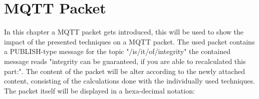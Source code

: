 \section{MQTT Packet}

In this chapter a MQTT packet gets introduced, this will be used to show the impact of the presented techniques on a MQTT packet.
The used packet contains a PUBLISH-type message for the topic "/is/it/of/integrity" the contained message reads "integrity can be guaranteed, if you are able to recalculated this part:".
The content of the packet will be alter according to the newly attached content, consisting of the calculations done with the individually used techniques. \\
\newpage
The packet itself will be displayed in a hexa-decimal notation: \\

